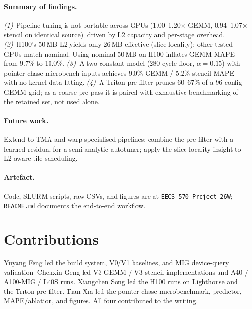 \documentclass[10pt,twocolumn]{article}
\begin{document}
\paragraph{Summary of findings.}
\emph{(1)}~Pipeline tuning is not portable across GPUs
(1.00--1.20$\times$ GEMM, 0.94--1.07$\times$ stencil on identical
source), driven by L2 capacity and per-stage overhead.
\emph{(2)}~H100's 50\,MB L2 yields only 26\,MB effective (slice
locality); other tested GPUs match nominal.  Using nominal 50\,MB
on H100 inflates GEMM MAPE from 9.7\% to 10.0\%.
\emph{(3)}~A two-constant model (280-cycle floor, $\alpha{=}0.15$)
with pointer-chase microbench inputs achieves 9.0\% GEMM / 5.2\%
stencil MAPE with no kernel-data fitting.
\emph{(4)}~A Triton pre-filter prunes 60--67\% of a 96-config
GEMM grid; as a coarse pre-pass it is paired with exhaustive
benchmarking of the retained set, not used alone.

\paragraph{Future work.}
Extend to TMA and warp-specialised pipelines; combine the
pre-filter with a learned residual for a semi-analytic autotuner;
apply the slice-locality insight to L2-aware tile scheduling.

\paragraph{Artefact.}
Code, SLURM scripts, raw CSVs, and figures are at
\texttt{EECS-570-Project-26W}; \texttt{README.md} documents the
end-to-end workflow.

\section*{Contributions}
\small
Yuyang Feng led the build system, V0/V1 baselines, and MIG
device-query validation.  Chenxin Geng led V3-GEMM / V3-stencil
implementations and A40 / A100-MIG / L40S runs.  Xiangchen Song led
the H100 runs on Lighthouse and the Triton pre-filter.  Tian Xia
led the pointer-chase microbenchmark, predictor, MAPE/ablation, and
figures.  All four contributed to the writing.



\end{document}
